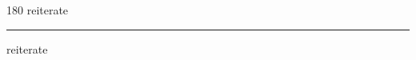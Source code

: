 
\begin{frame}
\begin{center}
\begin{turn}{180}
{\fontsize{2.5cm}{1em}\selectfont reiterate}
\end{turn}
\vspace{1em}\par  
\hrule
\vspace{1em}\par  
{\fontsize{2.5cm}{1em}\selectfont reiterate}
\end{center}
\end{frame}

